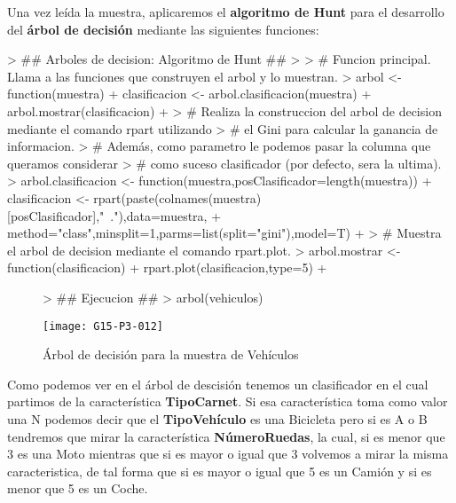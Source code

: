 \documentclass [a4paper] {article}
\begin{document}
\newpage
Una vez leída la muestra, aplicaremos el \textbf{algoritmo de Hunt} para el desarrollo del \textbf{árbol de decisión} mediante las siguientes funciones:
\begin{Schunk}
\begin{Sinput}
> ## Arboles de decision: Algoritmo de Hunt ##
> 
> # Funcion principal. Llama a las funciones que construyen el arbol y lo muestran.
> arbol <- function(muestra){
+   clasificacion <- arbol.clasificacion(muestra)
+   arbol.mostrar(clasificacion)
+ }
> # Realiza la construccion del arbol de decision mediante el comando rpart utilizando
> # el Gini para calcular la ganancia de informacion.
> # Además, como parametro le podemos pasar la columna que queramos considerar
> # como suceso clasificador (por defecto, sera la ultima).
> arbol.clasificacion <- function(muestra,posClasificador=length(muestra)){
+   clasificacion <- rpart(paste(colnames(muestra)[posClasificador],"~."),data=muestra,
+                          method="class",minsplit=1,parms=list(split="gini"),model=T)
+ }
> # Muestra el arbol de decision mediante el comando rpart.plot.
> arbol.mostrar <- function(clasificacion){
+    rpart.plot(clasificacion,type=5)
+ }
\end{Sinput}
\end{Schunk}

\begin{figure}[!h]
\centering
\begin{Schunk}
\begin{Sinput}
> ## Ejecucion ##
> arbol(vehiculos)
\end{Sinput}
\end{Schunk}
\texttt{[image: G15-P3-012]}
\caption{Árbol de decisión para la muestra de Vehículos}
\end{figure}
\newpage
Como podemos ver en el árbol de descisión tenemos un clasificador en el cual partimos de la característica \textbf{TipoCarnet}.
Si esa característica toma como valor una N podemos decir que el \textbf{TipoVehículo} es una Bicicleta pero si es A o B tendremos que mirar
la característica \textbf{NúmeroRuedas}, la cual, si es menor que 3 es una Moto mientras que si es mayor o igual que 3 volvemos a mirar la
misma caracteristica, de tal forma que si es mayor o igual que 5 es un Camión y si es menor que 5 es un Coche.

\newpage
\end{document}
